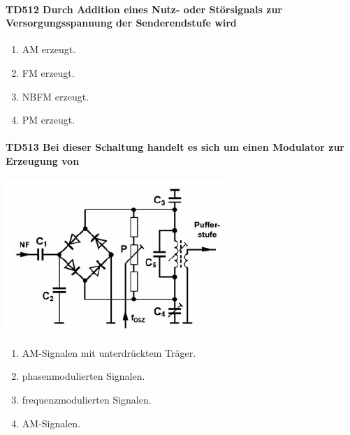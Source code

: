 \documentclass[8pt]{article}
\begin{document}
\begin{enumerate}
\begin{enumerate}[nolistsep,label=\Alph*]
\paragraph*{TD512 Durch Addition eines Nutz- oder Störsignals zur Versorgungsspannung der Senderendstufe wird}
\begin{enumerate}[nolistsep,label=\Alph*]
\item AM erzeugt.
\item FM erzeugt.
\item NBFM erzeugt.
\item PM erzeugt.
\end{enumerate}

\paragraph*{TD513 Bei dieser Schaltung handelt es sich um einen Modulator zur Erzeugung von}
\begin{center}
	\begin{minipage}{\linewidth}
		\centering
		\includegraphics[scale=1.0]{pics/td513_a.jpg}
	\end{minipage}
\end{center}
\begin{enumerate}[nolistsep,label=\Alph*]
\item AM-Signalen mit unterdrücktem Träger.
\item phasenmodulierten Signalen.
\item frequenzmodulierten Signalen.
\item AM-Signalen.
\end{enumerate}


\end{enumerate}
\end{enumerate}
\end{document}
